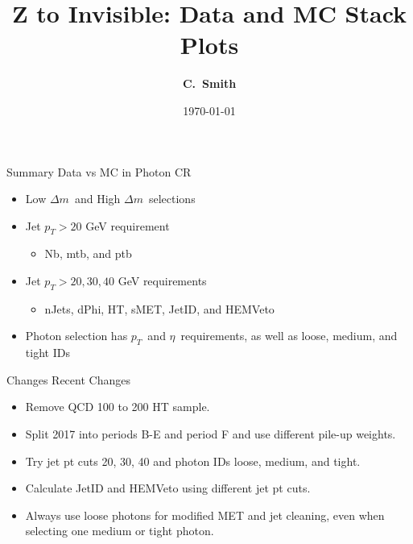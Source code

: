 \documentclass[10pt,xcolor=svgnames,fleqn,aspectratio=169]{beamer}
\title{Z to Invisible: Data and MC Stack Plots}
\author{\textcolor{DodgerBlueDark}{\bf C.~Smith\inst{1}}}
\institute{\inst{1} Baylor}
\date{\today}
\newcommand{\dm}{$\Delta m$~}
\newcommand{\pt}{$p_{T}$~}
\newcommand{\texeta}{$\eta$~}
\begin{document}
\begin{frame}[plain]
\maketitle
\end{frame}

\begin{frame}{Summary}
Data vs MC in Photon CR
\begin{itemize}
\item Low \dm and High \dm selections
\item Jet $p_T > 20$ GeV requirement
\begin{itemize}
\item Nb, mtb, and ptb
\end{itemize}
\item Jet $p_T > 20, 30, 40$ GeV requirements
\begin{itemize}
\item nJets, dPhi, HT, sMET, JetID, and HEMVeto
\end{itemize}
\item Photon selection has \pt and \texeta requirements, as well as loose, medium, and tight IDs
\end{itemize}
\end{frame}

\begin{frame}{Changes}
Recent Changes
\begin{itemize}
\item Remove QCD 100 to 200 HT sample.
\item Split 2017 into periods B-E and period F and use different pile-up weights.
\item Try jet pt cuts 20, 30, 40 and photon IDs loose, medium, and tight.
\item Calculate JetID and HEMVeto using different jet pt cuts.
\item Always use loose photons for modified MET and jet cleaning, even when selecting one medium or tight photon.
\end{itemize}
\end{frame}




\end{document}
